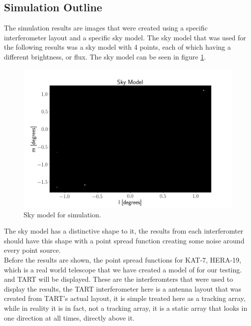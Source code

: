 \subsection{Simulation Outline}
The simulation results are images that were created using a specific interferometer layout and a specific sky model. The sky model that was used for the following results was a sky model with 4 points, each of which having a different brightness, or flux. The sky model can be seen in figure \ref{fig:Sky_model}.
\begin{figure}[H]
    \centering
    \includegraphics[scale=0.4]{images/4_POINT.png}
    \caption{Sky model for simulation.}
    \label{fig:Sky_model}
\end{figure}
\begin{center}
\end{center}
The sky model has a distinctive shape to it, the results from each interferomter should have this shape with a point spread function creating some noise around every point source. \\
Before the results are shown, the point spread functions for KAT-7, HERA-19, which is a real world telescope that we have created a model of for our testing.\cite{HERA-19} and TART will be displayed. These are the interferomters that were used to display the results, the TART interferometer here is a antenna layout that was created from TART's actual layout, it is simple treated here as a tracking array, while in reality it is in fact, not a tracking array, it is a static array that looks in one direction at all times, directly above it.
